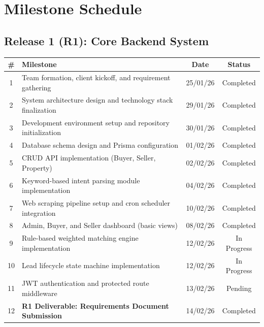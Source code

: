\documentclass[12pt,a4paper]{article}
\begin{document}
\newpage
\newpage
\section*{Milestone Schedule}

\renewcommand{\arraystretch}{1.4}

\subsection*{Release 1 (R1): Core Backend System}

\begin{center}
\begin{tabular}{|c|p{8cm}|c|c|}
\hline
\textbf{\#} & \textbf{Milestone} & \textbf{Date} & \textbf{Status} \\
\hline
1 & Team formation, client kickoff, and requirement gathering & 25/01/26 & Completed \\
\hline
2 & System architecture design and technology stack finalization & 29/01/26 & Completed \\
\hline
3 & Development environment setup and repository initialization & 30/01/26 & Completed \\
\hline
4 & Database schema design and Prisma configuration & 01/02/26 & Completed \\
\hline
5 & CRUD API implementation (Buyer, Seller, Property) & 02/02/26 & Completed \\
\hline
6 & Keyword-based intent parsing module implementation & 04/02/26 & Completed \\
\hline
7 & Web scraping pipeline setup and cron scheduler integration & 10/02/26 & Completed \\
\hline
8 & Admin, Buyer, and Seller dashboard (basic views) & 08/02/26 & Completed \\
\hline
9 & Rule-based weighted matching engine implementation & 12/02/26 & In Progress \\
\hline
10 & Lead lifecycle state machine implementation & 12/02/26 & In Progress \\
\hline
11 & JWT authentication and protected route middleware & 13/02/26 & Pending \\
\hline
12 & \textbf{R1 Deliverable: Requirements Document Submission} & 14/02/26 & Completed \\
\hline
\end{tabular}
\end{center}

\vspace{1cm}
\end{document}
